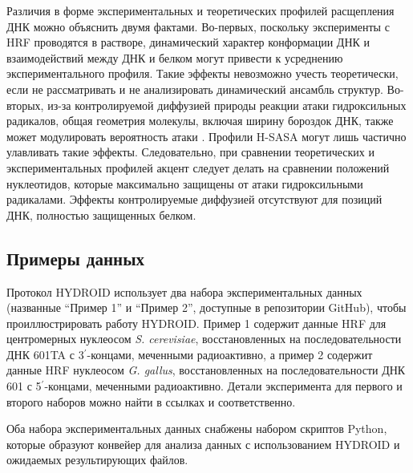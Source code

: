     Различия в форме экспериментальных и теоретических профилей расщепления ДНК можно объяснить двумя фактами. Во-первых, поскольку эксперименты с HRF проводятся в растворе, динамический характер конформации ДНК и взаимодействий между ДНК и белком могут привести к усреднению экспериментального профиля. Такие эффекты невозможно учесть теоретически, если не рассматривать и не анализировать динамический ансамбль структур. Во-вторых, из-за контролируемой диффузией природы реакции атаки гидроксильных радикалов, общая геометрия молекулы, включая ширину бороздок ДНК, также может модулировать вероятность атаки \cite{bishop_map_2011,begusova_radack_2001,spotheim-maurizot_radiation_2011}. Профили H-SASA могут лишь частично улавливать такие эффекты. Следовательно, при сравнении теоретических и экспериментальных профилей акцент следует делать на сравнении положений нуклеотидов, которые максимально защищены от атаки гидроксильными радикалами. Эффекты контролируемые диффузией отсутствуют для позиций ДНК, полностью защищенных белком.
    
    \subsection{Примеры данных}
    
    Протокол HYDROID использует два набора экспериментальных данных (названные ``Пример 1'' и ``Пример 2'', доступные  в репозитории GitHub), чтобы проиллюстрировать работу HYDROID. Пример 1 содержит данные HRF для центромерных нуклеосом \textit{S. cerevisiae}, восстановленных на последовательности ДНК 601TA с 3$^\prime$-концами, меченными радиоактивно, а пример 2 содержит данные HRF нуклеосом \textit{G. gallus}, восстановленных на последовательности ДНК 601 с 5$^\prime$-концами, меченными радиоактивно. Детали эксперимента для первого и второго наборов можно найти в ссылках \cite{shaytan_hydroxyl-radical_2017,xiao_molecular_2017} и \cite{morozov_using_2009} соответственно.

    Оба набора экспериментальных данных снабжены набором скриптов Python, которые образуют конвейер для анализа данных с использованием HYDROID и ожидаемых результирующих файлов.

